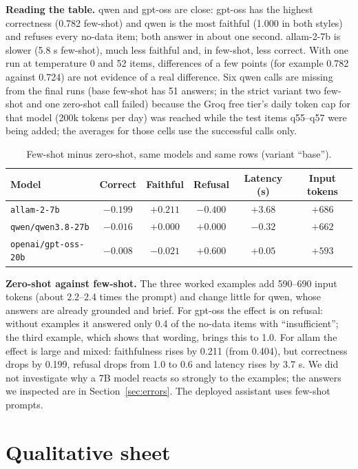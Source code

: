\documentclass[10pt,a4paper]{article}
\newcommand{\code}[1]{\texttt{#1}}
\begin{document}
\textbf{Reading the table.} qwen and gpt-oss are close: gpt-oss has the highest correctness (0.782 few-shot) and qwen is the most faithful (1.000 in both styles) and refuses every no-data item; both answer in about one second. allam-2-7b is slower (5.8 s few-shot), much less faithful and, in few-shot, less correct. With one run at temperature 0 and 52 items, differences of a few points (for example 0.782 against 0.724) are not evidence of a real difference. Six qwen calls are missing from the final runs (base few-shot has 51 answers; in the strict variant two few-shot and one zero-shot call failed) because the Groq free tier's daily token cap for that model (200k tokens per day) was reached while the test items q55--q57 were being added; the averages for those cells use the successful calls only.

\begin{table}[H]
\centering\small
\caption{Few-shot minus zero-shot, same models and same rows (variant ``base'').}\label{tab:fsdiff}
\begin{tabular}{lccccc}
\toprule
Model & Correct & Faithful & Refusal & Latency (s) & Input tokens \\
\midrule
\code{allam-2-7b} & $-0.199$ & $+0.211$ & $-0.400$ & $+3.68$ & $+686$ \\
\code{qwen/qwen3.8-27b} & $-0.016$ & $+0.000$ & $+0.000$ & $-0.32$ & $+662$ \\
\code{openai/gpt-oss-20b} & $-0.008$ & $-0.021$ & $+0.600$ & $+0.05$ & $+593$ \\
\bottomrule
\end{tabular}
\end{table}

\textbf{Zero-shot against few-shot.} The three worked examples add 590--690 input tokens (about 2.2--2.4 times the prompt) and change little for qwen, whose answers are already grounded and brief. For gpt-oss the effect is on refusal: without examples it answered only 0.4 of the no-data items with ``insufficient''; the third example, which shows that wording, brings this to 1.0. For allam the effect is large and mixed: faithfulness rises by 0.211 (from 0.404), but correctness drops by 0.199, refusal drops from 1.0 to 0.6 and latency rises by 3.7 s. We did not investigate why a 7B model reacts so strongly to the examples; the answers we inspected are in Section~\ref{sec:errors}. The deployed assistant uses few-shot prompts.

\section{Qualitative sheet}
\end{document}
